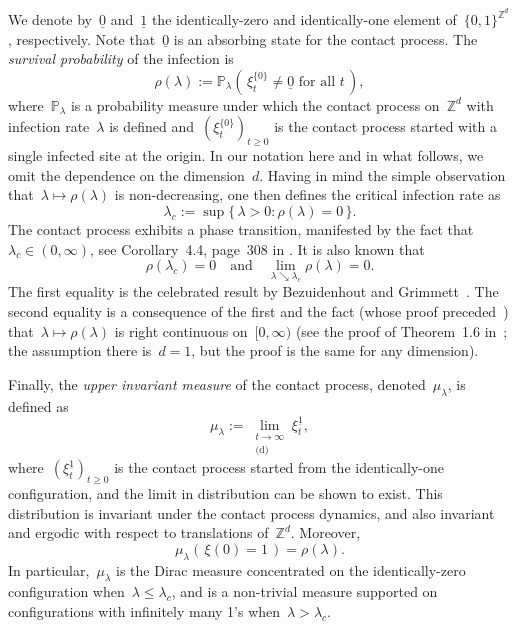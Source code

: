 \documentclass[a4paper,12pt]{article}
\newcommand{\Z}{\mathbb{Z}}
\begin{document}
We denote by~$\underline{0}$ and~$\underline{1}$ the identically-zero and identically-one element of~$\{0,1\}^{\mathbb{Z}^d}$, respectively. Note that~$\underline{0}$ is an absorbing state for the contact process. The \textit{survival probability} of the infection is
$$\rho(\lambda):= \mathbb{P}_\lambda( \, \xi^{\{0\}}_t \neq \underline{0} \text{ for all } t \, ),$$
where~$\mathbb{P}_\lambda$ is a probability measure under which the contact process on~$\mathbb{Z}^d$  with infection rate~$\lambda$  is defined and~$(\xi^{\{0\}}_t)_{t \geq 0}$ is the contact process started with a single infected site at the origin.
In our notation here and in what follows, we omit the dependence on the dimension~$d$. Having in mind the simple observation that~$\lambda \mapsto \rho(\lambda)$ is non-decreasing, one then defines the critical infection rate as
$$\lambda_c := \sup\{ \, \lambda > 0: \rho(\lambda) = 0 \, \}.$$
The contact process exhibits a phase transition, manifested by the fact that~$\lambda_c \in (0,\infty)$, see Corollary~4.4, page~308 in \cite{Li85}. It is also known that
\begin{equation}\label{eq:bez_grimm}
\rho(\lambda_c) = 0\quad \text{and}\quad \lim_{\lambda \searrow \lambda_c} \rho(\lambda) = 0.
\end{equation}
The first equality is the celebrated result by Bezuidenhout and Grimmett~\cite{BG90}. The second equality is a consequence of the first and the fact (whose proof preceded~\cite{BG90}) that~$\lambda \mapsto \rho(\lambda)$ is right continuous on~$[0,\infty)$ (see the proof of Theorem~1.6 in~\cite{Li85}; the assumption there is~$d=1$, but the proof is the same for any dimension).

\smallskip

Finally, the \textit{upper invariant measure} of the contact process, denoted~$\mu_\lambda$, is defined  as
$$\mu_\lambda:= \lim_{\substack{t\to \infty\\ \text{(d)}}} \xi^{\underline{1}}_t,$$
where~$(\xi^{\underline{1}}_t)_{t\geq 0}$ is the contact process started from the identically-one configuration, and the limit in distribution can be shown to exist. This distribution is invariant under the contact process dynamics, and also invariant and ergodic with respect to translations of~$\Z^d$. Moreover,
\begin{equation}\label{eq:density_nn}
\mu_\lambda(\, \xi(0)=1 \, ) = \rho(\lambda).
\end{equation}
 In particular,~$\mu_{\lambda}$ is the Dirac measure concentrated on the identically-zero configuration when~$\lambda \le \lambda_c$, and is a non-trivial measure supported on configurations with infinitely many 1's when~$\lambda > \lambda_c$.
\end{document}

